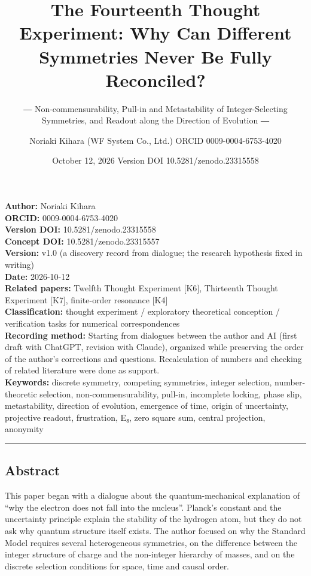 \documentclass[
  a4paper,
]{article}
\title{The Fourteenth Thought Experiment: Why Can Different Symmetries
Never Be Fully Reconciled?}
\subtitle{― Non-commensurability, Pull-in and Metastability of
Integer-Selecting Symmetries, and Readout along the Direction of
Evolution ―}
\author{Noriaki Kihara (WF System Co., Ltd.) ORCID 0009-0004-6753-4020}
\date{October 12, 2026 Version DOI 10.5281/zenodo.23315558}
\begin{document}
\maketitle

\textbf{Author:} Noriaki Kihara\\
\textbf{ORCID:} 0009-0004-6753-4020\\
\textbf{Version DOI:} 10.5281/zenodo.23315558\\
\textbf{Concept DOI:} 10.5281/zenodo.23315557\\
\textbf{Version:} v1.0 (a discovery record from dialogue; the research
hypothesis fixed in writing)\\
\textbf{Date:} 2026-10-12\\
\textbf{Related papers:} Twelfth Thought Experiment {[}K6{]}, Thirteenth
Thought Experiment {[}K7{]}, finite-order resonance {[}K4{]}\\
\textbf{Classification:} thought experiment / exploratory theoretical
conception / verification tasks for numerical correspondences\\
\textbf{Recording method:} Starting from dialogues between the author
and AI (first draft with ChatGPT, revision with Claude), organized while
preserving the order of the author's corrections and questions.
Recalculation of numbers and checking of related literature were done as
support.\\
\textbf{Keywords:} discrete symmetry, competing symmetries, integer
selection, number-theoretic selection, non-commensurability, pull-in,
incomplete locking, phase slip, metastability, direction of evolution,
emergence of time, origin of uncertainty, projective readout,
frustration, E₈, zero square sum, central projection, anonymity

\begin{center}\rule{0.5\linewidth}{0.5pt}\end{center}

\subsection{Abstract}\label{abstract}

This paper began with a dialogue about the quantum-mechanical
explanation of ``why the electron does not fall into the nucleus''.
Planck's constant and the uncertainty principle explain the stability of
the hydrogen atom, but they do not ask why quantum structure itself
exists. The author focused on why the Standard Model requires several
heterogeneous symmetries, on the difference between the integer
structure of charge and the non-integer hierarchy of masses, and on the
discrete selection conditions for space, time and causal order.
\end{document}
